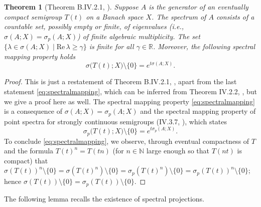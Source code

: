 \documentclass[a4paper, 12pt, oneside, reqno, notitlepage]{amsart}
\theoremstyle{plain}
\newtheorem{theorem}{Theorem}
\theoremstyle{definition}
\theoremstyle{remark}
\begin{document}
\begin{theorem}[Theorem B.IV.2.1, \cite{arendt1986one}] \label{thm:spectrum}
    Suppose $A$ is the generator of an eventually compact semigroup $T(t)$ on a Banach space $X$.
    The spectrum of $A$ consists of a countable set, possibly empty or finite,
    of eigenvalues (i.e., $\sigma(A;X) = \sigma_p(A;X) $) of finite algebraic multiplicity. 
    The set $\{ \lambda \in \sigma(A;X) \; | \; \mathrm{Re} \, \lambda \geq \gamma \}$ is finite for all $\gamma \in \mathbb{R}$.
    Moreover, the following spectral mapping property holds
    \begin{equation}
        \sigma\big(T(t);X\big)\setminus \{ 0\} = e^{t \sigma(A;X)}.
        \label{eq:spectralmapping}
    \end{equation}
\end{theorem}

\begin{proof}
    This is just a restatement of Theorem B.IV.2.1, \cite{arendt1986one}, apart from the last statement \eqref{eq:spectralmapping}, which can be inferred from Theorem IV.2.2, \cite{diekmann2012delay}, but we give a proof here as well. 
    The spectral mapping property \eqref{eq:spectralmapping} is a consequence of $\sigma(A;X) = \sigma_p(A;X)$ and the spectral mapping property of point spectra for strongly continuous semigroups (IV.3.7, \cite{engel2000one}), which states
    \begin{displaymath}
        \sigma_p\big(T(t);X\big)\setminus \{ 0\} = e^{t \sigma_p(A;X)}.
    \end{displaymath}
    To conclude \eqref{eq:spectralmapping}, we observe, through eventual compactness of $T$ and the formula $T(t)^n = T(tn)$ (for $n \in \mathbb{N}$ large enough so that $T(nt)$ is compact) that $\sigma(T(t))^n \setminus \{0\}=\sigma(T(t)^n)\setminus\{0\}  = \sigma_p(T(t)^n) \setminus\{0\}  = \sigma_p(T(t))^n \setminus\{0\}$; hence $\sigma(T(t)) \setminus \{0\} = \sigma_p(T(t)) \setminus \{0\}$.
\end{proof}



The following lemma recalls the existence of spectral projections.
\end{document}
